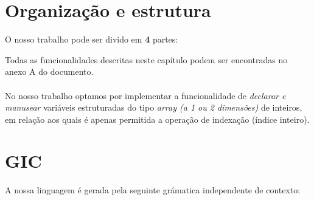 \documentclass[11pt,a4paper]{report}%
\begin{document}
\section{Organização e estrutura}
O nosso trabalho pode ser divido em \textbf{4} partes:
Todas as funcionalidades descritas neste capítulo podem ser encontradas no anexo A do documento.\\ \\
No nosso trabalho optamos por implementar a funcionalidade de \textit{declarar e manusear} variáveis estruturadas do tipo \textit{array (a 1 ou 2 dimensões)} de inteiros, em relação aos quais é apenas permitida a operação de indexação (índice inteiro).\\

\section{GIC}
A nossa linguagem é gerada pela seguinte grámatica independente de contexto:
\end{document}
